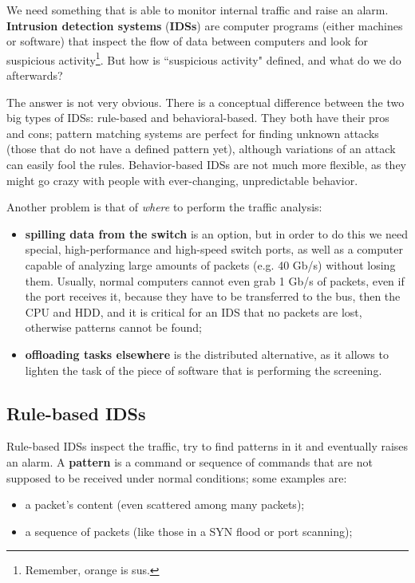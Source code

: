 We need something that is able to monitor internal traffic and raise an alarm. \textbf{Intrusion detection systems} (\textbf{IDSs}) are computer programs (either machines or software) that inspect the flow of data between computers and look for suspicious activity\footnote{Remember, orange is sus.}. But how is “suspicious activity" defined, and what do we do afterwards?
 
The answer is not very obvious. There is a conceptual difference between the two big types of IDSs: rule-based and behavioral-based. They both have their pros and cons;  pattern matching systems are perfect for finding unknown attacks (those that do not have a defined pattern yet), although variations of an attack can easily fool the rules. Behavior-based IDSs are not much more flexible, as they might go crazy with people with ever-changing, unpredictable behavior.

Another problem is that of \textit{where} to perform the traffic analysis:

\begin{itemize}
    \item \textbf{spilling data from the switch} is an option, but in order to do this we need special, high-performance and high-speed switch ports, as well as a computer capable of analyzing large amounts of packets (e.g. 40 Gb/s) without losing them. Usually, normal computers cannot even grab 1 Gb/s of packets, even if the port receives it, because they have to be transferred to the bus, then the CPU and HDD, and it is critical for an IDS that no packets are lost, otherwise patterns cannot be found;
    \item \textbf{offloading tasks elsewhere} is the distributed alternative, as it allows to lighten the task of the piece of software that is performing the screening.
\end{itemize}


\subsection{Rule-based IDSs}
Rule-based IDSs inspect the traffic, try to find patterns in it and eventually raises an alarm. A \textbf{pattern} is a command or sequence of commands that are not supposed to be received under normal conditions; some examples are:

\begin{itemize}
	\item a packet’s content (even scattered among many packets);
	\item a sequence of packets (like those in a SYN flood or port scanning);
\end{itemize}

